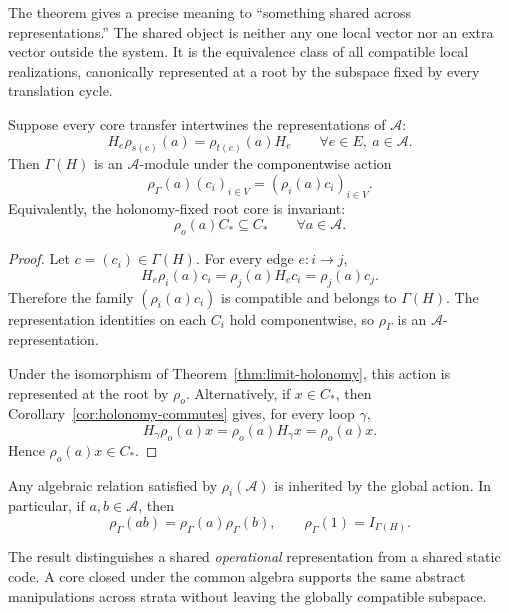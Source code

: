 
The theorem gives a precise meaning to ``something shared across
representations.'' The shared object is neither any one local vector nor an
extra vector outside the system. It is the equivalence class of all compatible
local realizations, canonically represented at a root by the subspace fixed by
every translation cycle.


\begin{theorem}\label{thm:operator-closure}
Suppose every core transfer intertwines the representations of
\(\mathcal A\):
\[
H_e\rho_{s(e)}(a)=\rho_{t(e)}(a)H_e
\qquad
\forall e\in E,\ a\in\mathcal A.
\]
Then \(\Gamma(H)\) is an \(\mathcal A\)-module under the componentwise action
\[
\rho_\Gamma(a)(c_i)_{i\in V}
=
(\rho_i(a)c_i)_{i\in V}.
\]
Equivalently, the holonomy-fixed root core is invariant:
\[
\boxed{
\rho_o(a)C_*\subseteq C_*
\qquad
\forall a\in\mathcal A.
}
\]
\end{theorem}

\begin{proof}
Let \(c=(c_i)\in\Gamma(H)\). For every edge \(e:i\to j\),
\[
H_e\rho_i(a)c_i
=
\rho_j(a)H_ec_i
=
\rho_j(a)c_j.
\]
Therefore the family \((\rho_i(a)c_i)\) is compatible and belongs to
\(\Gamma(H)\). The representation identities on each \(C_i\) hold
componentwise, so \(\rho_\Gamma\) is an \(\mathcal A\)-representation.

Under the isomorphism of Theorem~\ref{thm:limit-holonomy}, this action is
represented at the root by \(\rho_o\). Alternatively, if \(x\in C_*\), then
Corollary~\ref{cor:holonomy-commutes} gives, for every loop \(\gamma\),
\[
H_\gamma\rho_o(a)x
=
\rho_o(a)H_\gamma x
=
\rho_o(a)x.
\]
Hence \(\rho_o(a)x\in C_*\).
\end{proof}

\begin{corollary}\label{cor:inherited-structure}
Any algebraic relation satisfied by \(\rho_i(\mathcal A)\) is inherited by the
global action. In particular, if \(a,b\in\mathcal A\), then
\[
\rho_\Gamma(ab)=\rho_\Gamma(a)\rho_\Gamma(b),
\qquad
\rho_\Gamma(1)=I_{\Gamma(H)}.
\]
\end{corollary}

The result distinguishes a shared \emph{operational} representation from a
shared static code. A core closed under the common algebra supports the same
abstract manipulations across strata without leaving the globally compatible
subspace.

